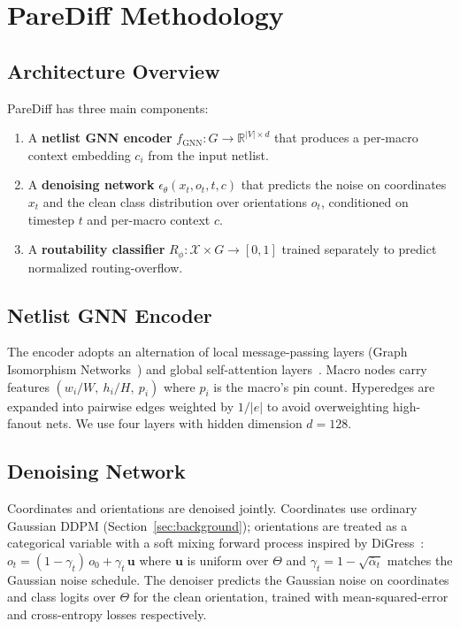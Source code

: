 \documentclass{ieeeaccess}
\begin{document}
\section{PareDiff Methodology}
\label{sec:method}

\subsection{Architecture Overview}
\label{ssec:arch}

PareDiff has three main components:
\begin{enumerate}
\item A \textbf{netlist GNN encoder} $f_\textrm{GNN}: G \to \mathbb{R}^{|V| \times d}$ that produces a per-macro context embedding $c_i$ from the input netlist.
\item A \textbf{denoising network} $\epsilon_\theta(x_t, o_t, t, c)$ that predicts the noise on coordinates $x_t$ and the clean class distribution over orientations $o_t$, conditioned on timestep $t$ and per-macro context $c$.
\item A \textbf{routability classifier} $R_\phi: \mathcal{X} \times G \to [0, 1]$ trained separately to predict normalized routing-overflow.
\end{enumerate}

\subsection{Netlist GNN Encoder}

The encoder adopts an alternation of local message-passing layers (Graph Isomorphism Networks~\cite{xu2018gin}) and global self-attention layers~\cite{vaswani2017attention}. Macro nodes carry features $(w_i / W,\ h_i / H,\ p_i)$ where $p_i$ is the macro's pin count. Hyperedges are expanded into pairwise edges weighted by $1/|e|$ to avoid overweighting high-fanout nets. We use four layers with hidden dimension $d=128$.

\subsection{Denoising Network}

Coordinates and orientations are denoised jointly. Coordinates use ordinary Gaussian DDPM (Section~\ref{sec:background}); orientations are treated as a categorical variable with a soft mixing forward process inspired by DiGress~\cite{vignac2023digress}: $o_t = (1-\gamma_t)\, o_0 + \gamma_t\, \mathbf{u}$ where $\mathbf{u}$ is uniform over $\Theta$ and $\gamma_t = 1 - \sqrt{\bar{\alpha}_t}$ matches the Gaussian noise schedule. The denoiser predicts the Gaussian noise on coordinates and class logits over $\Theta$ for the clean orientation, trained with mean-squared-error and cross-entropy losses respectively.
\end{document}
